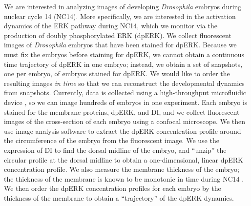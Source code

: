 \documentclass[10pt]{article}
\begin{document}
We are interested in analyzing images of developing {\em Drosophila} embryos during nuclear cycle 14 (NC14).
%
More specifically, we are interested in the activation dynamics of the ERK pathway during NC14, which we monitor via the production of doubly phosphorylated ERK (dpERK).
%
We collect fluorescent images of {\em Drosophila} embryos that have been stained for dpERK. 
%
Because we must fix the embryos before staining for dpERK, we cannot obtain a continuous time trajectory of dpERK in one embryo; instead, we obtain a set of snapshots, one per embryo, of embryos stained for dpERK. 
% 
We would like to order the resulting images {\em in time} so that we can reconstruct the developmental dynamics from snapshots. 
%
%
Currently, data is collected using a high-throughput microfluidic device \cite{chung2010microfluidic}, so we can image hundreds of embryos in one experiment.
%
Each embryo is stained for the membrane proteins, dpERK, and DI, and we collect fluorescent images of the cross-section of each embryo using a confocal microscope.
%
We then use image analysis software to extract the dpERK concentration profile around the circumference of the embryo from the fluorescent image.
%
We use the expression of DI to find the dorsal midline of the embryo, and ``unzip'' the circular profile at the dorsal midline to obtain a one-dimensional, linear dpERK concentration profile.
%
We also measure the membrane thickness of the embryo; the thickness of the membrane is known to be monotonic in time during NC14 \cite{lim2013kinetics, lecuit2002slam}. 
%
We then order the dpERK concentration profiles for each embryo by the thickness of the membrane to obtain a ``trajectory'' of the dpERK dynamics.
\end{document}

